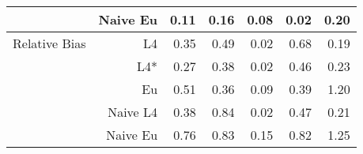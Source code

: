 \documentclass[a4paper,12pt,twoside]{book}
\begin{document}
\begin{table}[H]
\begin{tabular}{crrrrrr}
&Naive Eu &  0.11 & 0.16 & 0.08 & 0.02 & 0.20 \\ 
  
   \hline
   
{\color{blue} Relative Bias } & L4  &0.35 & 0.49 & 0.02 & 0.68 & 0.19 \\ 
   
&L4*  &0.27 & 0.38 & 0.02 & 0.46 & 0.23 \\ 
 
 
  
&Eu &  
   0.51 & 0.36 & 0.09 & 0.39 & 1.20 \\ 
  
&Naive L4&  
  
   0.38 & 0.84 & 0.02 & 0.47 & 0.21 \\
 
  
  
&Naive Eu &  
  0.76 & 0.83 & 0.15 & 0.82 & 1.25 \\ 
  
\end{tabular}

\end{table}
\end{document}

